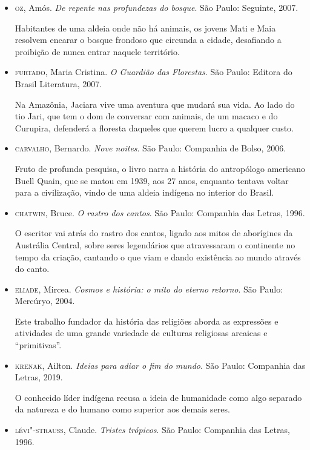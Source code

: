 \documentclass[12pt]{extarticle}
\begin{document}
\begin{itemize}

\item\textsc{oz}, Amós. \emph{De repente nas profundezas do bosque}. São Paulo:
Seguinte, 2007.

Habitantes de uma aldeia onde não há animais, os jovens Mati e Maia
resolvem encarar o bosque frondoso que circunda a cidade, desafiando a
proibição de nunca entrar naquele território.

\item\textsc{furtado}, Maria Cristina. \emph{O Guardião das Florestas}. São Paulo:
Editora do Brasil Literatura, 2007.

Na Amazônia, Jaciara vive uma aventura que mudará sua vida. Ao lado do
tio Jari, que tem o dom de conversar com animais, de um macaco e do
Curupira, defenderá a floresta daqueles que querem lucro a qualquer
custo.

\item\textsc{carvalho}, Bernardo. \emph{Nove noites}. São Paulo: Companhia de Bolso, 2006.

Fruto de profunda pesquisa, o livro narra a história do antropólogo
americano Buell Quain, que se matou em 1939, aos 27 anos, enquanto
tentava voltar para a civilização, vindo de uma aldeia indígena no
interior do Brasil.

\item\textsc{chatwin}, Bruce. \emph{O rastro dos cantos}. São Paulo: Companhia das
Letras, 1996.

O escritor vai atrás do rastro dos cantos, ligado aos mitos de
aborígines da Austrália Central, sobre seres legendários que
atravessaram o continente no tempo da criação, cantando o que viam e
dando existência ao mundo através do canto.


\item\textsc{eliade}, Mircea. \emph{Cosmos e história: o mito do eterno retorno}. São Paulo: Mercúryo, 2004.

Este trabalho fundador da história das religiões aborda as expressões e
atividades de uma grande variedade de culturas religiosas arcaicas e
``primitivas''.

\item\textsc{krenak}, Ailton. \emph{Ideias para adiar o fim do mundo}. São Paulo:
Companhia das Letras, 2019.

O conhecido líder indígena recusa a ideia de humanidade como algo
separado da natureza e do humano como superior aos demais seres.

\item\textsc{lévi"-strauss}, Claude. \emph{Tristes trópicos}. São Paulo: Companhia das Letras, 1996.


\end{itemize}
\end{document}
